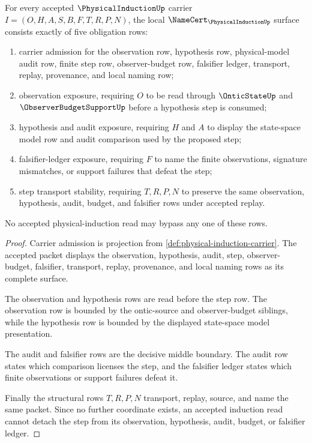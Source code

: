 \begin{theorem}
\label{thm:physical-induction-namecert-obligations}
For every accepted $\PhysicalInductionUp$ carrier $I=(O,H,A,S,B,F,T,R,P,N)$, the local $\NameCert_{\PhysicalInductionUp}$ surface consists exactly of five obligation rows:
\begin{enumerate}
\item carrier admission for the observation row, hypothesis row, physical-model audit row, finite step row, observer-budget row, falsifier ledger, transport, replay, provenance, and local naming row;
\item observation exposure, requiring $O$ to be read through $\OnticStateUp$ and $\ObserverBudgetSupportUp$ before a hypothesis step is consumed;
\item hypothesis and audit exposure, requiring $H$ and $A$ to display the state-space model row and audit comparison used by the proposed step;
\item falsifier-ledger exposure, requiring $F$ to name the finite observations, signature mismatches, or support failures that defeat the step;
\item step transport stability, requiring $T,R,P,N$ to preserve the same observation, hypothesis, audit, budget, and falsifier rows under accepted replay.
\end{enumerate}
No accepted physical-induction read may bypass any one of these rows.
\end{theorem}
\begin{proof}
Carrier admission is projection from \autoref{def:physical-induction-carrier}. The accepted packet displays the observation, hypothesis, audit, step, observer-budget, falsifier, transport, replay, provenance, and local naming rows as its complete surface.

The observation and hypothesis rows are read before the step row. The observation row is bounded by the ontic-source and observer-budget siblings, while the hypothesis row is bounded by the displayed state-space model presentation.

The audit and falsifier rows are the decisive middle boundary. The audit row states which comparison licenses the step, and the falsifier ledger states which finite observations or support failures defeat it.

Finally the structural rows $T,R,P,N$ transport, replay, source, and name the same packet. Since no further coordinate exists, an accepted induction read cannot detach the step from its observation, hypothesis, audit, budget, or falsifier ledger.
\end{proof}

